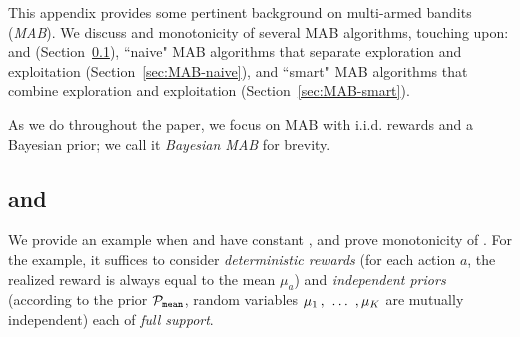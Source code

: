 
\newcommand{\ExplorExploit}{\term{ExplorExploit}}
\newcommand{\PhasedExplorExploit}{\term{PhasedExplorExploit}}
\newcommand{\RandomDynGreedy}{\term{RandomDynGreedy}}
\newcommand{\SuccesiveElimination}{\term{SuccesiveElimination}}
\newcommand{\SuccesiveEliminationReset}{\term{SuccesiveEliminationReset}}

This appendix provides some pertinent background on multi-armed
bandits (\emph{MAB}). We discuss \BIR and monotonicity of several MAB algorithms, touching upon: \DynGreedy and \StaticGreedy (Section~\ref{sec:MAB-greedy}), ``naive" MAB algorithms that separate exploration and exploitation (Section~\ref{sec:MAB-naive}), and ``smart" MAB algorithms that combine exploration and exploitation (Section~\ref{sec:MAB-smart}).

As we do throughout the paper, we focus on MAB with i.i.d. rewards and a Bayesian prior; we call it \emph{Bayesian MAB} for brevity.




\subsection{\DynGreedy and \StaticGreedy}
\label{sec:MAB-greedy}

We provide an example when \DynGreedy and \StaticGreedy have
constant \BIR, and prove monotonicity of \DynGreedy. For the
example, it suffices to consider \emph{deterministic rewards} (for
each action $a$, the realized reward is always equal to the mean
$\mu_a$) and \emph{independent priors} (according to the prior
$\mathcal{P}_\mathtt{mean}$, random variables $\mu_1 \, ,\ \ldots\ , \mu_K$ are mutually
independent) each of {\em full support}.

